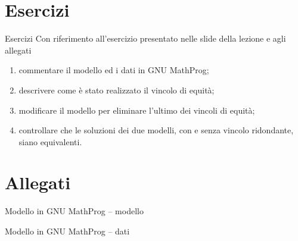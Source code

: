 \documentclass{beamer}
\begin{document}
\generatitolo

\section{Esercizi}

\begin{frame}
{Esercizi}
Con riferimento all'esercizio presentato nelle slide della lezione e agli allegati

\begin{enumerate}
 \item commentare il modello ed i dati in GNU MathProg;
 \item descrivere come \`e stato realizzato il vincolo di equit\`a;
 \item modificare il modello per eliminare l'ultimo dei vincoli di
	equit\`a;
 \item controllare che le soluzioni dei due modelli, con e senza vincolo ridondante,
       siano equivalenti.
\end{enumerate}

\end{frame}

\section{Allegati}


\begin{frame}[allowframebreaks]{Modello in GNU MathProg -- modello}

\end{frame}


\begin{frame}[allowframebreaks]{Modello in GNU MathProg -- dati}

\end{frame}
\end{document}
